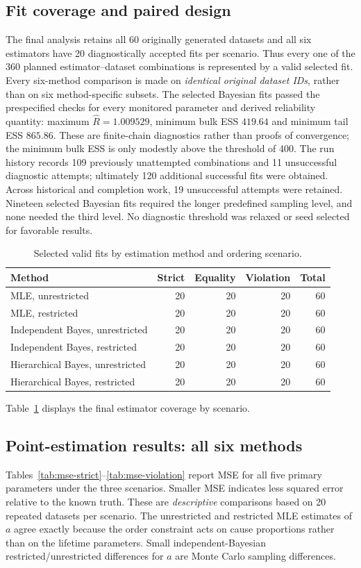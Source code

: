 \documentclass[a4paper,11pt]{article}
\begin{document}
\subsection{Fit coverage and paired design}
The final analysis retains all 60 originally generated datasets and all six estimators have
20 diagnostically accepted fits per scenario. Thus every one of the 360 planned estimator--dataset
combinations is represented by a valid selected fit. Every six-method comparison is made on
\emph{identical original dataset IDs}, rather than on six method-specific subsets. The selected Bayesian fits passed the prespecified checks for every monitored parameter and derived reliability quantity: maximum $\widehat R=1.009529$, minimum bulk ESS $419.64$ and minimum tail ESS $865.86$. These are finite-chain diagnostics rather than proofs of convergence; the minimum bulk ESS is only modestly above the threshold of 400. The run history records 109 previously unattempted combinations and 11 unsuccessful diagnostic attempts; ultimately 120 additional successful fits were obtained. Across historical and completion work, 19 unsuccessful attempts were retained. Nineteen selected Bayesian fits required the longer predefined sampling level, and none needed the third level. No diagnostic threshold was relaxed or seed selected for favorable results.

\begin{table}[htbp]\centering\small
\caption{Selected valid fits by estimation method and ordering scenario.}\label{tab:sim-completion}
\begin{tabular}{lrrrr}\toprule
Method & Strict & Equality & Violation & Total\\\midrule
MLE, unrestricted &20&20&20&60\\
MLE, restricted &20&20&20&60\\
Independent Bayes, unrestricted &20&20&20&60\\
Independent Bayes, restricted &20&20&20&60\\
Hierarchical Bayes, unrestricted &20&20&20&60\\
Hierarchical Bayes, restricted &20&20&20&60\\\bottomrule
\end{tabular}
\end{table}

Table~\ref{tab:sim-completion} displays the final estimator coverage by scenario.

\subsection{Point-estimation results: all six methods}
Tables~\ref{tab:mse-strict}--\ref{tab:mse-violation} report MSE for all five primary
parameters under the three scenarios. Smaller MSE indicates less squared error relative to the
known truth. These are \emph{descriptive} comparisons based on 20 repeated datasets per scenario.
The unrestricted and restricted MLE estimates of $a$ agree exactly because the order constraint
acts on cause proportions rather than on the lifetime parameters. Small independent-Bayesian
restricted/unrestricted differences for $a$ are Monte Carlo sampling differences.
\end{document}
